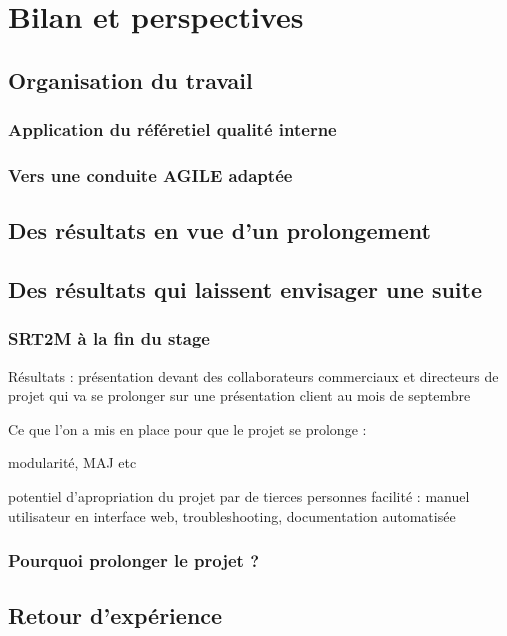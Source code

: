 \chapter{Bilan et perspectives}
\label{chap:bilan}

\section{Organisation du travail}
\label{sec:orga}
  \subsection{Application du référetiel qualité interne}
  
  \subsection{Vers une conduite AGILE adaptée}
  
\section{Des résultats en vue d'un prolongement}  
\section{Des résultats qui laissent envisager une suite}
  \subsection{SRT2M à la fin du stage}
  
  Résultats : présentation devant des collaborateurs commerciaux et directeurs de projet qui va se prolonger sur une présentation client au mois de septembre 
  
  Ce que l'on a mis en place pour que le projet se prolonge : 
  
  modularité, MAJ etc
  
  potentiel d'apropriation du projet par de tierces personnes facilité : manuel utilisateur en interface web, troubleshooting, documentation automatisée 
  
  
  
  \subsection{Pourquoi prolonger le projet ?}
  
\section{Retour d'expérience}
